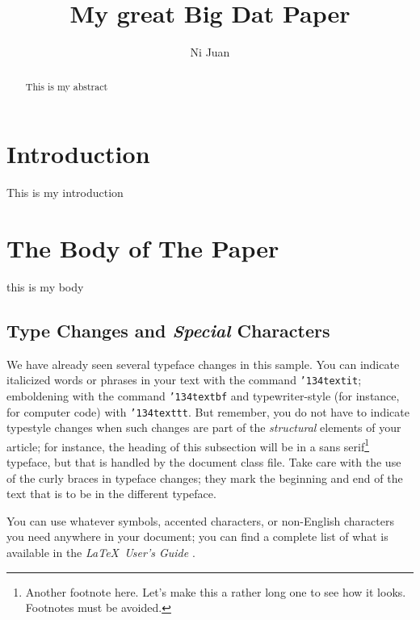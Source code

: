 \documentclass[sigconf]{acmart}
\begin{document}
\title{My great Big Dat Paper}


\author{Ni Juan}



\begin{abstract}
This is my abstract
\end{abstract}



\maketitle

\section{Introduction}

This is my introduction

\section{The Body of The Paper}

this is my body

\subsection{Type Changes and {\itshape Special} Characters}

We have already seen several typeface changes in this sample.  You can
indicate italicized words or phrases in your text with the command
\texttt{{\char'134}textit}; emboldening with the command
\texttt{{\char'134}textbf} and typewriter-style (for instance, for
computer code) with \texttt{{\char'134}texttt}.  But remember, you do
not have to indicate typestyle changes when such changes are part of
the \textit{structural} elements of your article; for instance, the
heading of this subsection will be in a sans serif\footnote{Another
  footnote here.  Let's make this a rather long one to see how it
  looks. Footnotes must be avoided.} typeface, but that is handled by
the document class file.  Take care with the use of the curly braces
in typeface changes; they mark the beginning and end of the text that
is to be in the different typeface.

You can use whatever symbols, accented characters, or non-English
characters you need anywhere in your document; you can find a complete
list of what is available in the \textit{\LaTeX\ User's Guide}
\cite{Lamport:LaTeX}.
\end{document}
